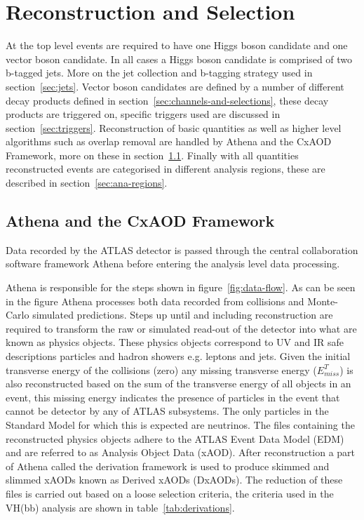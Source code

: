 \chapter{Reconstruction and Selection}%
\label{ch:recon}

At the top level events are required to have one Higgs boson candidate and one
vector boson candidate. In all cases a Higgs boson candidate is comprised of two
b-tagged jets. More on the jet collection and b-tagging strategy used in
section~\ref{sec:jets}. Vector boson candidates are defined by a number of
different decay products defined in section~\ref{sec:channels-and-selections},
these decay products are triggered on, specific triggers used are discussed in
section~\ref{sec:triggers}. Reconstruction of basic quantities as well as higher
level algorithms such as overlap removal are handled by Athena and the CxAOD
Framework, more on these in section~\ref{sec:cxaod}. Finally with all quantities
reconstructed events are categorised in different analysis regions, these are
described in section~\ref{sec:ana-regions}.

\section{Athena and the CxAOD Framework}
\label{sec:cxaod}
Data recorded by the ATLAS detector is passed through the central collaboration
software framework Athena before entering the analysis level data processing.

Athena is responsible for the steps shown in figure~\ref{fig:data-flow}. As can
be seen in the figure Athena processes both data recorded from collisions and
Monte-Carlo simulated predictions. Steps up until and including reconstruction
are required to transform the raw or simulated read-out of the detector into
what are known as physics objects. These physics objects correspond to UV and IR
safe descriptions particles and hadron showers e.g. leptons and jets. Given the
initial transverse energy of the collisions (zero) any missing transverse energy
($E^T_{miss}$) is also reconstructed based on the sum of the transverse energy
of all objects in an event, this missing energy indicates the presence of
particles in the event that cannot be detector by any of ATLAS subsystems. The
only particles in the Standard Model for which this is expected are neutrinos.
The files containing the reconstructed physics objects adhere to the ATLAS Event
Data Model (EDM) and are referred to as Analysis Object Data (xAOD). After
reconstruction a part of Athena called the derivation framework is used to
produce skimmed and slimmed xAODs known as Derived xAODs (DxAODs). The reduction
of these files is carried out based on a loose selection criteria, the criteria
used in the VH(bb) analysis are shown in table~\ref{tab:derivations}.

